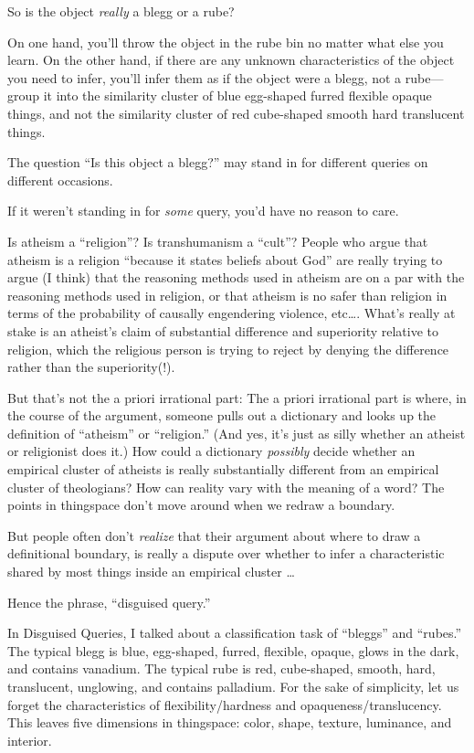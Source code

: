 {
 So is the object \textit{really} a blegg or a rube?}

{
 On one hand, you'll throw the object in the rube
bin no matter what else you learn. On the other hand, if there are any
unknown characteristics of the object you need to infer,
you'll infer them as if the object were a blegg, not a
rube---group it into the similarity cluster of blue egg-shaped furred
flexible opaque things, and not the similarity cluster of red
cube-shaped smooth hard translucent things.}

{
 The question ``Is this object a
blegg?'' may stand in for different queries on
different occasions.}

{
 If it weren't standing in for \textit{some} query,
you'd have no reason to care.}

{
 Is atheism a ``religion''? Is
transhumanism a ``cult''? People who
argue that atheism is a religion ``because it states
beliefs about God'' are really trying to argue (I
think) that the reasoning methods used in atheism are on a par with the
reasoning methods used in religion, or that atheism is no safer than
religion in terms of the probability of causally engendering violence,
etc\ldots. What's really at stake is an
atheist's claim of substantial difference and
superiority relative to religion, which the religious person is trying
to reject by denying the difference rather than the superiority(!).}

{
 But that's not the a priori irrational part: The a
priori irrational part is where, in the course of the argument, someone
pulls out a dictionary and looks up the definition of
``atheism'' or
``religion.'' (And yes,
it's just as silly whether an atheist or religionist
does it.) How could a dictionary \textit{possibly} decide whether an
empirical cluster of atheists is really substantially different from an
empirical cluster of theologians? How can reality vary with the meaning
of a word? The points in thingspace don't move around
when we redraw a boundary.}

{
 But people often don't \textit{realize} that their
argument about where to draw a definitional boundary, is really a
dispute over whether to infer a characteristic shared by most things
inside an empirical cluster \ldots}

{
 Hence the phrase, ``disguised
query.''}

\myendsectiontext


{
 In Disguised Queries, I talked about a classification task of
``bleggs'' and
``rubes.'' The typical blegg is
blue, egg-shaped, furred, flexible, opaque, glows in the dark, and
contains vanadium. The typical rube is red, cube-shaped, smooth, hard,
translucent, unglowing, and contains palladium. For the sake of
simplicity, let us forget the characteristics of flexibility/hardness
and opaqueness/translucency. This leaves five dimensions in thingspace:
color, shape, texture, luminance, and interior. }

